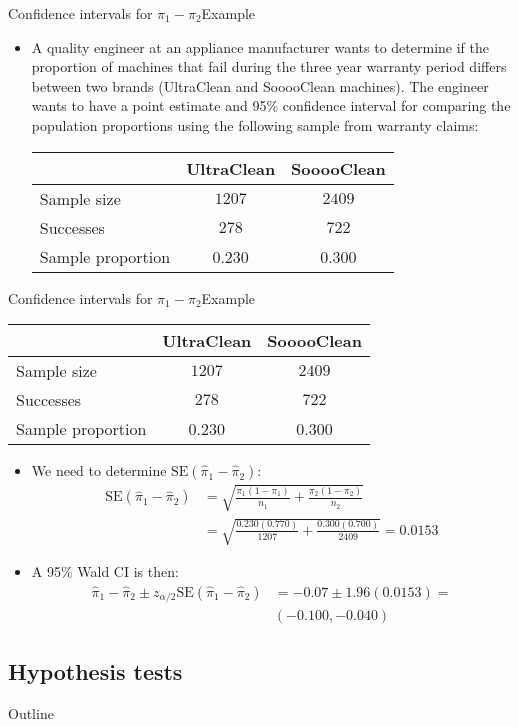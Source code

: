 \documentclass[xcolor=dvipsnames]{beamer}
\begin{document}
\begin{frame}{Confidence intervals for $\pi_1 - \pi_2$}{Example}
	\begin{itemize}
		\item A quality engineer at an appliance manufacturer wants to determine if the proportion of machines that fail during the three year warranty period differs between two brands (UltraClean and SooooClean machines). The engineer wants to have a point estimate and 95\% confidence interval for comparing the population proportions using the following sample from warranty claims:
		\vspace{3mm}
		\begin{center}
			\begin{tabular}{lcc}
				\hline
				& UltraClean & SooooClean \\ \hline
				Sample size & $1207$ & $2409$ \\
				Successes & $278$ & $722$ \\
				Sample proportion & 0.230 & 0.300 \\ \hline
			\end{tabular}
		\end{center}
	\end{itemize}
\end{frame}

\begin{frame}{Confidence intervals for $\pi_1 - \pi_2$}{Example}
	{\tiny
		\begin{center}
			\begin{tabular}{lcc}
				\hline
				& UltraClean & SooooClean \\ \hline
				Sample size & $1207$ & $2409$ \\
				Successes & $278$ & $722$ \\
				Sample proportion & 0.230 & 0.300 \\ \hline
			\end{tabular}
\end{center}}
	\begin{itemize}
		\item We need to determine $\text{SE}(\hat{\pi}_1-\hat{\pi}_2)$: 
		\begin{align*}
		\text{SE}(\hat{\pi}_1-\hat{\pi}_2) &= \sqrt{\frac{\pi_1 (1-\pi_1)}{n_1}+\frac{\pi_2 (1-\pi_2)}{n_2}}  \\ &=\sqrt{\frac{0.230 (0.770)}{1207}+\frac{0.300 (0.700)}{2409}} = 0.0153
		\end{align*}
		\item A 95\% Wald CI is then:
		\begin{align*}
			\hat{\pi}_1 - \hat{\pi}_2 \pm z_{\alpha/2}\text{SE}(\hat{\pi}_1-\hat{\pi}_2) &= -0.07 \pm 1.96 (0.0153) =\\& (-0.100, -0.040)
		\end{align*}
	\end{itemize}
\end{frame}

\subsection{Hypothesis tests}

\begin{frame}{Outline}
	\tableofcontents[currentsection,subsectionstyle=show/shaded/hide]
\end{frame}
\end{document}
